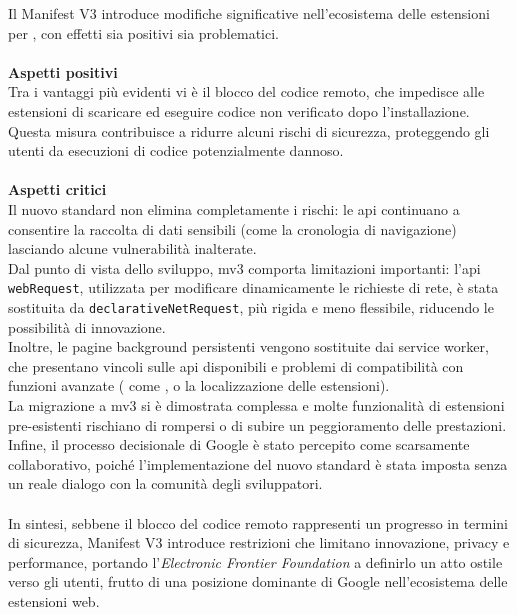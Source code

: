 \noindent Il Manifest V3 introduce modifiche significative nell’ecosistema delle estensioni per , con effetti sia positivi sia problematici.\\
\\
\textbf{Aspetti positivi}\\
Tra i vantaggi più evidenti vi è il blocco del codice remoto, che impedisce alle estensioni di scaricare ed eseguire codice non verificato dopo l’installazione. Questa misura contribuisce a ridurre alcuni rischi di sicurezza, proteggendo gli utenti da esecuzioni di codice potenzialmente dannoso.\\
\\
\textbf{Aspetti critici}\\
Il nuovo standard non elimina completamente i rischi: le \acrshort{api} continuano a consentire la raccolta di dati sensibili (come la cronologia di navigazione) lasciando alcune vulnerabilità inalterate. \\Dal punto di vista dello sviluppo, \acrshort{mv3} comporta limitazioni importanti: l'\acrshort{api} \texttt{webRequest}, utilizzata per modificare dinamicamente le richieste di rete, è stata sostituita da \texttt{declarativeNetRequest}, più rigida e meno flessibile, riducendo le possibilità di innovazione. \\Inoltre, le pagine background persistenti vengono sostituite dai service worker, che presentano vincoli sulle \acrshort{api} disponibili e problemi di compatibilità con funzioni avanzate ( come ,  o la localizzazione delle estensioni). 
\\La migrazione a \acrshort{mv3} si è dimostrata complessa e molte funzionalità di estensioni pre-esistenti rischiano di rompersi o di subire un peggioramento delle prestazioni. Infine, il processo decisionale di Google è stato percepito come scarsamente collaborativo, poiché l’implementazione del nuovo standard è stata imposta senza un reale dialogo con la comunità degli sviluppatori.\\
\\
In sintesi, sebbene il blocco del codice remoto rappresenti un progresso in termini di sicurezza, Manifest V3 introduce restrizioni che limitano innovazione, privacy e performance, portando l’\textit{Electronic Frontier Foundation} a definirlo un atto ostile verso gli utenti, frutto di una posizione dominante di Google nell’ecosistema delle estensioni web.

